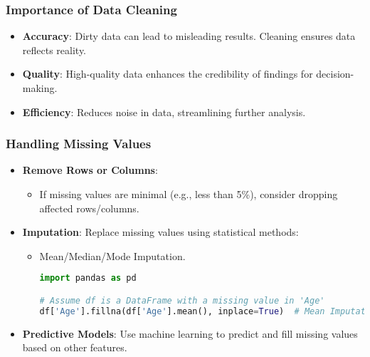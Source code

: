 \documentclass{beamer}
\begin{document}
\begin{frame}
    \frametitle{Importance of Data Cleaning}
    \begin{itemize}
        \item \textbf{Accuracy}: Dirty data can lead to misleading results. Cleaning ensures data reflects reality.
        \item \textbf{Quality}: High-quality data enhances the credibility of findings for decision-making.
        \item \textbf{Efficiency}: Reduces noise in data, streamlining further analysis.
    \end{itemize}
\end{frame}

\begin{frame}
    \frametitle{Handling Missing Values}
    \begin{itemize}
        \item \textbf{Remove Rows or Columns}: 
            \begin{itemize}
                \item If missing values are minimal (e.g., less than 5\%), consider dropping affected rows/columns.
            \end{itemize}
        \item \textbf{Imputation}: Replace missing values using statistical methods:
            \begin{itemize}
                \item Mean/Median/Mode Imputation.
                \begin{lstlisting}[language=Python]
import pandas as pd

# Assume df is a DataFrame with a missing value in 'Age'
df['Age'].fillna(df['Age'].mean(), inplace=True)  # Mean Imputation
                \end{lstlisting}
            \end{itemize}
        \item \textbf{Predictive Models}: Use machine learning to predict and fill missing values based on other features.
    \end{itemize}
\end{frame}
\end{document}

